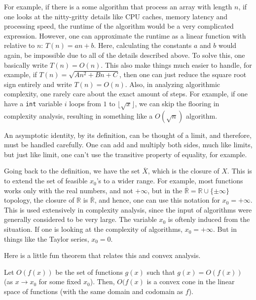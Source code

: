For example, if there is a some algorithm that process an array with length \( n
\), if one looks at the nitty-gritty details like CPU caches, memory latency and
processing speed, the runtime of the algorithm would be a very complicated
expression. However, one can approximate the runtime as a linear function with
relative to \( n \): \( T(n) = an + b \). Here, calculating the constants \( a \) and
\( b \) would again, be impossible due to all of the details described above. To
solve this, one basically write \( T(n) = O(n) \). This also make things much
easier to handle, for example, if \( T(n) = \sqrt{An^2 + Bn + C}  \), then one
can just reduce the square root sign entirely and write \( T(n) = O(n)  \).
Also, in analyzing algorithmic complexity, one rarely care about the exact
amount of steps. For example, if one have a \verb|int| variable \( i \) loops from
\( 1 \) to \( \lfloor \sqrt{x} \rfloor \), we can skip the flooring in
complexity analysis, resulting in something like a \( O(\sqrt{n} ) \)
algorithm.

An asymptotic identity, by its definition, can be thought of a limit, and
therefore, must be handled carefully. One can add and multiply both sides, much
like limits, but just like limit, one can't use the transitive property of
equality, for example.

Going back to the definition, we have the set \( \overline{X}  \), which is the
closure of \( X \). This is to extend the set of feasible \( x_{0} \)'s to a
wider range. For example, most functions works only with the real numbers, and
not \( +\infty \), but in the \( \overline{\mathbb{R}} = \mathbb{R} \cup \{\pm
\infty\}    \) topology, the closure of \( \mathbb{R} \) is \(
\overline{\mathbb{R}}  \), and hence, one can use this notation for \( x_{0} =
+\infty \). This is used extensively in complexity analysis, since the input of
algorithms were generally considered to be very large. The variable \( x_{0} \)
is oftenly induced from the situation. If one is looking at the complexity of
algorithms, \( x_{0} = +\infty \). But in things like the Taylor series, \(
x_{0} = 0 \).

\iffalse
Here is a little fun theorem that relates this and convex analysis.

\begin{theorem}
\label{thr:Big-O functions form a convex cone}
  Let \( O(f(x)) \) be the set of functions \( g(x) \) such that \( g(x) =
  O(f(x)) \) (as \( x \to x_{0} \) for some fixed \( x_{0} \)).
  Then, \( O(f(x) \) is a convex cone in the linear space of
  functions (with the same domain and codomain as \( f \)).
\end{theorem}

